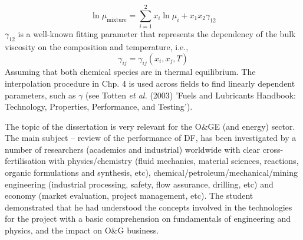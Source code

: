 \documentclass[14pt,twoside]{report}
\begin{document}
\begin{enumerate}
\begin{displaymath}
\ln \mu_{\text{mixture}} = \sum\limits_{i=1}^{2} x_{i}\ln\mu_{i} + x_{1}x_{2}\gamma_{12} 
\end{displaymath} 
$\gamma_{12}$ is a well-known fitting parameter that represents the dependency of the bulk viscosity on the composition and temperature, i.e., 
\begin{displaymath}
\gamma_{ij}=\gamma_{ij}\left(x_{i},x_{j}, T\right)
\end{displaymath} 
Assuming that both chemical species are in thermal equilibrium. The interpolation procedure in Chp. 4 is used across fields to find linearly dependent parameters, such as $\gamma$ (see Totten {\it et al.} (2003) 'Fuels and Lubricants Handbook: Technology, Properties, Performance, and Testing').
%
\end{enumerate}

The topic of the dissertation is very relevant for the O$\&$GE (and energy) sector. The main subject -- review of the performance of DF,  has been investigated by a number of researchers (academics and industrial) worldwide with clear cross-fertilisation with physics/chemistry (fluid mechanics, material sciences, reactions, organic formulations and synthesis, etc), chemical/petroleum/mechanical/mining engineering (industrial processing, safety, flow assurance, drilling, etc) and economy (market evaluation, project management, etc). The student demonstrated that he had understood the concepts involved in the technologies for the project with a basic comprehension on fundamentals of engineering and physics, and the impact on O$\&$G business.    


%  

   
\end{document}
